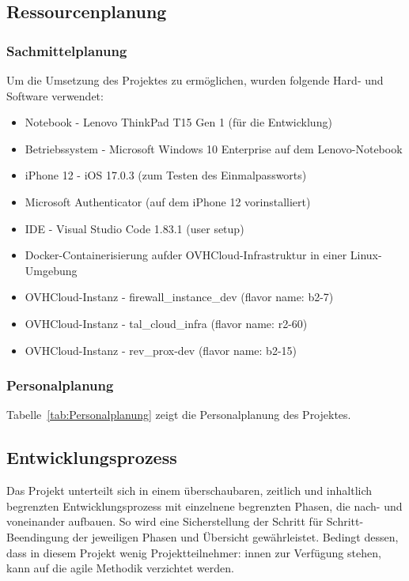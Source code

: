 \subsection{Ressourcenplanung}
\label{sec:Ressourcenplanung}

\subsubsection{Sachmittelplanung}
\label{sec:Sachmittelplanung}
Um die Umsetzung des Projektes zu ermöglichen, wurden folgende Hard- und Software verwendet:
\begin{itemize}
	\item Notebook - Lenovo ThinkPad T15 Gen 1 (für die Entwicklung)
	\item Betriebssystem - Microsoft Windows 10 Enterprise auf dem Lenovo-Notebook
	\item iPhone 12 - iOS 17.0.3 (zum Testen des Einmalpassworts)
	\item Microsoft Authenticator (auf dem iPhone 12 vorinstalliert)
	\item IDE - Visual Studio Code 1.83.1 (user setup)
	\item Docker-Containerisierung aufder OVHCloud-Infrastruktur in einer Linux-Umgebung
	\item OVHCloud-Instanz - firewall\_instance\_dev (flavor name: b2-7)
	\item OVHCloud-Instanz - tal\_cloud\_infra (flavor name: r2-60)
	\item OVHCloud-Instanz - rev\_prox-dev (flavor name: b2-15)
\end{itemize}

\subsubsection{Personalplanung}
\label{sec:Personalplanung}
Tabelle~\ref{tab:Personalplanung} zeigt die Personalplanung des Projektes.

\subsection{Entwicklungsprozess}
\label{sec:Entwicklungsprozess}
Das Projekt unterteilt sich in einem überschaubaren, zeitlich und inhaltlich begrenzten Entwicklungsprozess 
mit einzelnene begrenzten Phasen, die nach- und voneinander aufbauen. So wird eine Sicherstellung der Schritt 
für Schritt-Beendingung der jeweiligen Phasen und Übersicht gewährleistet. Bedingt dessen, dass in diesem Projekt 
wenig Projektteilnehmer: innen zur Verfügung stehen, kann auf die agile Methodik verzichtet werden.
